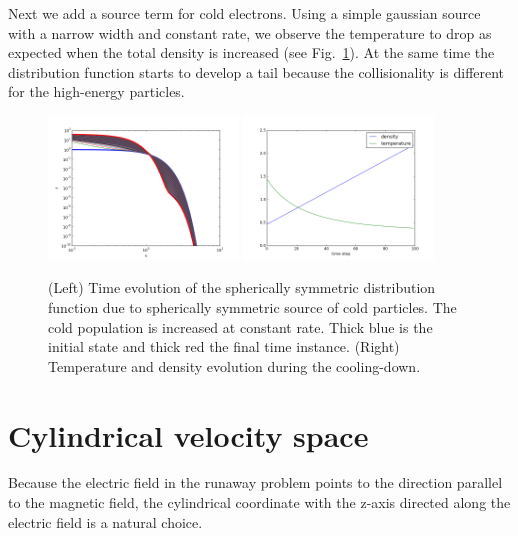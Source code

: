 \documentclass[reprint]{revtex4}
\begin{document}
Next we add a source term for cold electrons. Using a simple gaussian source with a narrow width and constant rate, we observe the temperature to drop as expected when the total density is increased (see Fig.~\ref{fig:spherical_cooling_test}). At the same time the distribution function starts to develop a tail because the collisionality is different for the high-energy particles.
\begin{figure}[!h]
\includegraphics[width=0.45\textwidth]{fig/f_cooling_down.png}
\includegraphics[width=0.45\textwidth]{fig/spherically_symmetric_temperature_relaxation.png}
\caption{(Left) Time evolution of the spherically symmetric distribution function due to spherically symmetric source of cold particles. The cold population is increased at constant rate. Thick blue is the initial state and thick red the final time instance. (Right) Temperature and density evolution during the cooling-down.}
\label{fig:spherical_cooling_test}
\end{figure}


\section{Cylindrical velocity space}
Because the electric field in the runaway problem points to the direction parallel to the magnetic field, the cylindrical coordinate with the z-axis directed along the electric field is a natural choice. 
\end{document}
